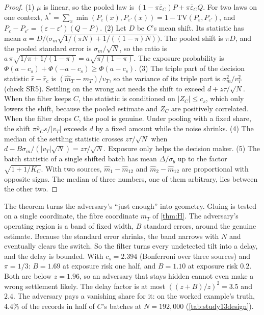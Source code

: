 \documentclass[11pt]{article}
\theoremstyle{definition}\newtheorem{definition}{Definition}\newtheorem{remark}{Remark}
\begin{document}
\begin{proof}
(1) $\mu$ is linear, so the pooled law is $(1-\pi\bar\varepsilon_C)P+\pi\bar\varepsilon_CQ$. For two laws on one context,
$\lambda^*=\sum_x\min(P_\varepsilon(x),P_{\varepsilon'}(x))=1-\mathrm{TV}(P_\varepsilon,P_{\varepsilon'})$, and
$P_\varepsilon-P_{\varepsilon'}=(\varepsilon-\varepsilon')(Q-P)$.
(2) Let $D$ be $C$'s mean shift. Its statistic has mean
$a=D/\bigl(\sigma_m\sqrt{1/(\pi N)+1/((1-\pi)N)}\bigr)$. The pooled shift is $\pi D$, and the pooled standard error is
$\sigma_m/\sqrt N$, so the ratio is $a\,\pi\sqrt{1/\pi+1/(1-\pi)}=a\sqrt{\pi/(1-\pi)}$. The exposure probability is
$\Phi(a-c_s)+\Phi(-a-c_s)\ge\Phi(a-c_s)$.
(3) The triple part of the decision statistic $\hat r-\hat r_c$ is $(\hat m_T-m_T)/v_T$, so the variance of its triple part is
$\sigma_m^2/v_T^2$ (check SR5). Settling on the wrong act needs the shift to exceed $d+z\tau/\sqrt N$. When the filter keeps $C$, the
statistic is conditioned on $|Z_C|\le c_s$, which only lowers the shift, because the pooled estimate and $Z_C$ are positively
correlated. When the filter drops $C$, the pool is genuine. Under pooling with a fixed share, the shift $\pi\bar\varepsilon_Cs/|v_T|$
exceeds $d$ by a fixed amount while the noise shrinks.
(4) The median of the settling statistic crosses $z\tau/\sqrt N$ when $d-B\sigma_m/(|v_T|\sqrt N)=z\tau/\sqrt N$. Exposure only helps
the decision maker.
(5) The batch statistic of a single shifted batch has mean $\Delta/\sigma_b$ up to the factor $\sqrt{1+1/K_C}$. With two sources,
$\hat m_1-\hat m_{12}$ and $\hat m_2-\hat m_{12}$ are proportional with opposite signs. The median of three numbers, one of them
arbitrary, lies between the other two.
\end{proof}

The theorem turns the adversary's ``just enough'' into geometry. Gluing is tested on a single coordinate, the fibre coordinate $m_T$ of
\cref{thm:H}. The adversary's operating region is a band of fixed width, $B$ standard errors, around the genuine estimate. Because the
standard error shrinks, the band narrows with $N$ and eventually clears the switch. So the filter turns every undetected tilt into a
delay, and the delay is bounded. With $c_s=2.394$ (Bonferroni over three sources) and $\pi=1/3$: $B=1.69$ at exposure risk one half,
and $B=1.10$ at exposure risk $0.2$. Both are below $z=1.96$, so an adversary that stays hidden cannot even make a wrong settlement
likely. The delay factor is at most $((z+B)/z)^2=3.5$ and $2.4$. The adversary pays a vanishing share for it: on the worked example's
truth, $4.4\%$ of the records in half of $C$'s batches at $N=192{,}000$ (\cref{tab:study13design}).
\end{document}

